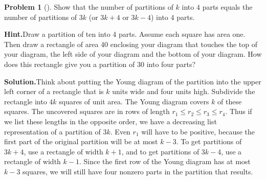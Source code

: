 \documentclass[10pt,]{book}
\theoremstyle{plain}
\theoremstyle{definition}
\newtheorem{activity}[project]{Problem}
\theoremstyle{definition}
\numberwithin{equation}{chapter}
\begin{document}
\begin{activity}[]\label{rectanglecomplement}
Show that the number of partitions of \(k\) into \(4\) parts equals the number of partitions of \(3k\) (or \(3k+4\) or \(3k-4\)) into \(4\) parts.%
\par\medskip\noindent%
\textbf{Hint.}\quad Draw a partition of ten into 4 parts. Assume each square has area one. Then draw a rectangle of area 40 enclosing your diagram that touches the top of your diagram, the left side of your diagram and the bottom of your diagram. How does this rectangle give you a partition of 30 into four parts?%
\par\medskip\noindent%
\textbf{Solution.}\quad Think about putting the Young diagram of the partition into the upper left corner of a rectangle that is \(k\) units wide and four units high. Subdivide the rectangle into \(4k\) squares of unit area. The Young diagram covers \(k\) of these squares. The uncovered squares are in rows of length \(r_1\le r_2\le r_3\le r_4\). Thus if we list these lengths in the opposite order, we have a decreasing list representation of a partition of \(3k\). Even \(r_1\) will have to be positive, because the first part of the original partition will be at most \(k-3\). To get partitions of \(3k+4\), use a rectangle of width \(k+1\), and to get partitions of \(3k-4\), use a rectangle of width \(k-1\). Since the first row of the Young diagram has at most \(k-3\) squares, we will still have four nonzero parts in the partition that results.%
\end{activity}
\end{document}
